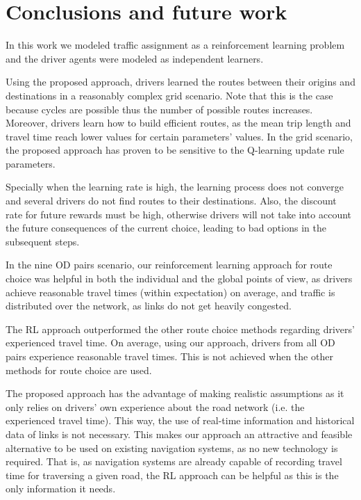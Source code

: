 \documentclass{RITA}
\begin{document}
\section{Conclusions and future work}
\label{sec:conclusions}

In this work we modeled traffic assignment as a reinforcement learning problem and the driver agents were modeled as independent learners.

Using the proposed approach, drivers learned the routes between their origins and destinations in a reasonably complex grid scenario. Note that this is the case because cycles are possible thus the number of possible routes increases. Moreover, drivers learn how to build efficient routes, as the mean trip length and travel time reach lower values for certain parameters' values. In the grid scenario, the proposed approach has proven to be sensitive to the Q-learning update rule parameters. 

Specially when the learning rate is high, the learning process does not converge and several drivers do not find routes to their destinations. Also, the discount rate for future rewards must be high, otherwise drivers will not take into account the future consequences of the current choice, leading to bad options in the subsequent steps.

In the nine OD pairs scenario, our reinforcement learning approach for route choice was helpful in both the individual and the global points of view, as drivers achieve reasonable travel times (within expectation) on average, and traffic is distributed over the network, as links do not get heavily congested.

The RL approach outperformed the other route choice methods regarding drivers' experienced travel time. On average, using our approach, drivers from all OD pairs experience reasonable travel times. This is not achieved when the other methods for route choice are used.


The proposed approach has the advantage of making realistic assumptions as it only relies on drivers' own experience about the road network (i.e. the experienced travel time). This way, the use of real-time information and historical data of links is not necessary. This makes our approach an attractive and feasible alternative to be used on existing navigation systems, as no new technology is required. That is, as navigation systems are already capable of recording travel time for traversing a given road, the RL approach can be helpful as this is the only information it needs.
\end{document}
